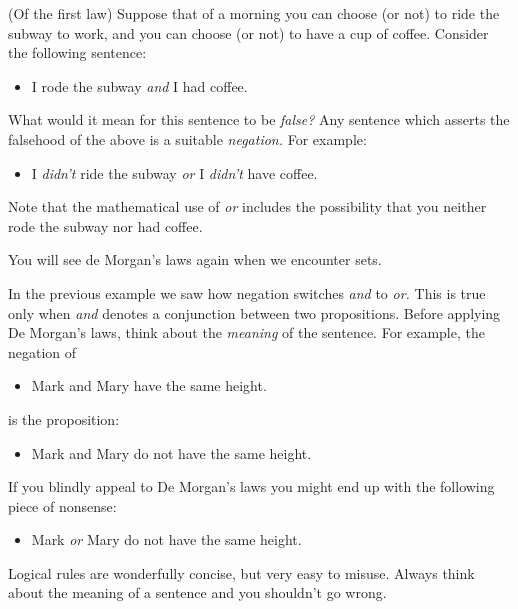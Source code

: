 \begin{example}
(Of the first law) Suppose that of a morning you can choose (or not) to ride the subway to work, and you can choose (or not) to have a cup of coffee. Consider the following sentence:
\begin{itemize}\setlength{\itemsep}{0pt}
  \item[] I rode the subway \emph{and} I had coffee.
\end{itemize}
What would it mean for this sentence to be \emph{false?} Any sentence which asserts the falsehood of the above is a suitable \emph{negation.} For example:
\begin{itemize}\setlength{\itemsep}{0pt}
  \item[] I \emph{didn't} ride the subway \emph{or} I \emph{didn't} have coffee.
\end{itemize}
Note that the mathematical use of \emph{or} includes the possibility that you neither rode the subway nor had coffee.
\end{example}

\noindent You will see de Morgan's laws again when we encounter sets.

\begin{aside}

In the previous example we saw how negation switches \emph{and} to \emph{or.} This is true only when \emph{and} denotes a conjunction between two propositions. Before applying De Morgan's laws, think about the \emph{meaning} of the sentence. For example, the negation of
\begin{itemize}\setlength{\itemsep}{0pt}
  \item[] Mark and Mary have the same height.
\end{itemize}
is the proposition:
\begin{itemize}\setlength{\itemsep}{0pt}
  \item[] Mark and Mary do not have the same height.
\end{itemize}
If you blindly appeal to De Morgan's laws you might end up with the following piece of nonsense:
\begin{itemize}\setlength{\itemsep}{0pt}
  \item[] Mark \emph{or} Mary do not have the same height.
\end{itemize}
Logical rules are wonderfully concise, but very easy to misuse. Always think about the meaning of a sentence and you shouldn't go wrong.
\end{aside}
 
